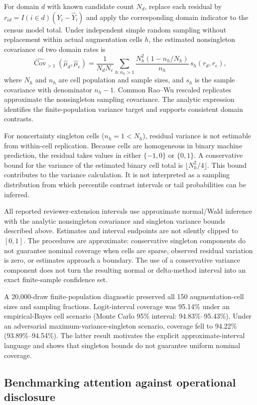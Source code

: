 \documentclass[12pt]{article}
\begin{document}
For domain $d$ with known candidate count $N_d$, replace each residual by
$r_{id}=I(i\in d)(Y_i-\widehat Y_i)$ and apply the corresponding domain
indicator to the census model total. Under independent simple random sampling
without replacement within actual augmentation cells $h$, the estimated
nonsingleton covariance of two domain rates is
\[
\widehat{\operatorname{Cov}}_{>1}(\widehat\mu_d,\widehat\mu_e)
=\frac{1}{N_dN_e}\sum_{h:n_h>1}
\frac{N_h^2(1-n_h/N_h)}{n_h}\,s_h(r_d,r_e),
\]
where $N_h$ and $n_h$ are cell population and sample sizes, and $s_h$ is the
sample covariance with denominator $n_h-1$. Common Rao--Wu rescaled replicates approximate the nonsingleton sampling
covariance. The analytic expression identifies the finite-population variance
target and supports consistent domain contrasts.

For noncertainty singleton cells ($n_h=1<N_h$), residual variance is not
estimable from within-cell replication. Because cells are homogeneous in
binary machine prediction, the residual takes values in either $\{-1,0\}$
or $\{0,1\}$. A conservative bound for the variance of the estimated
binary cell total is $\lfloor N_h^2/4\rfloor$. This bound contributes to the variance calculation. It is not interpreted
as a sampling distribution from which percentile contrast intervals or tail
probabilities can be inferred.

All reported reviewer-extension intervals use approximate normal/Wald
inference with the analytic nonsingleton covariance and singleton variance
bounds described above. Estimates and interval endpoints are not silently
clipped to $[0,1]$. The procedures are
approximate: conservative singleton components do not guarantee nominal
coverage when cells are sparse, observed residual variation is zero, or
estimates approach a boundary. The use of a conservative variance component does not turn the resulting
normal or delta-method interval into an exact finite-sample confidence set.

A 20,000-draw finite-population diagnostic preserved all 150 augmentation-cell
sizes and sampling fractions. Logit-interval coverage was 95.14\% under an
empirical-Bayes cell scenario (Monte Carlo 95\% interval:
94.83\%--95.43\%). Under an adversarial maximum-variance-singleton scenario,
coverage fell to 94.22\% (93.89\%--94.54\%). The latter result motivates the
explicit approximate-interval language and shows that singleton bounds do not
guarantee uniform nominal coverage.

\subsection{Benchmarking attention against operational disclosure}
\end{document}
